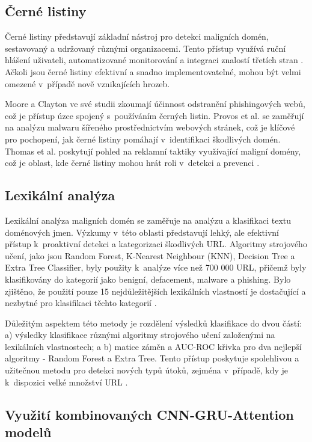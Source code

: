 \subsection{Černé listiny} \label{blacklists}
Černé listiny představují základní nástroj pro detekci maligních domén, sestavovaný a udržovaný různými organizacemi. Tento přístup využívá ruční hlášení uživateli, automatizované monitorování a integraci znalostí třetích stran \cite{ovi}. Ačkoli jsou černé listiny efektivní a snadno implementovatelné, mohou být velmi omezené v~případě nově vznikajících hrozeb.

Moore a Clayton ve své studii zkoumají účinnost odstranění phishingových webů, což je přístup úzce spojený s~používáním černých listin. \cite{moore-clayton} Provos et al. se zaměřují na analýzu malwaru šířeného prostřednictvím webových stránek, což je klíčové pro pochopení, jak černé listiny pomáhají v~identifikaci škodlivých domén. \cite{provos-etal} Thomas et al. poskytují pohled na reklamní taktiky využívající maligní domény, což je oblast, kde černé listiny mohou hrát roli v~detekci a prevenci \cite{thomas2015ad}.



\subsection{Lexikální analýza}
Lexikální analýza maligních domén se zaměřuje na analýzu a klasifikaci textu doménových jmen. Výzkumy v~této oblasti představují lehký, ale efektivní přístup k~proaktivní detekci a kategorizaci škodlivých URL. Algoritmy strojového učení, jako jsou Random Forest, K-Nearest Neighbour (KNN), Decision Tree a Extra Tree Classifier, byly použity k~analýze více než 700 000 URL, přičemž byly klasifikovány do kategorií jako benigní, defacement, malware a phishing. Bylo zjištěno, že použití pouze 15 nejdůležitějších lexikálních vlastností je dostačující a nezbytné pro klasifikaci těchto kategorií \cite{ma2011learning,perdisci2012url}.

Důležitým aspektem této metody je rozdělení výsledků klasifikace do dvou částí: a) výsledky klasifikace různými algoritmy strojového učení založenými na lexikálních vlastnostech; a b) matice záměn a AUC-ROC křivka pro dva nejlepší algoritmy - Random Forest a Extra Tree. Tento přístup poskytuje spolehlivou a užitečnou metodu pro detekci nových typů útoků, zejména v~případě, kdy je k~dispozici velké množství URL \cite{sahoo2017malicious,srinivasan2018detecting}.

\subsection{Využití kombinovaných CNN-GRU-Attention modelů}


